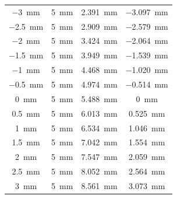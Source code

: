 \begin{table}[ht]
\begin{tabular}{| c | c | c | c |}
        \SI{-3}{mm}           & \SI{5}{mm}     & \SI{2.391}{mm}      & \SI{-3.097}{mm}   \\
        \SI{-2.5}{mm}         & \SI{5}{mm}     & \SI{2.909}{mm}      & \SI{-2.579}{mm}   \\
        \SI{-2}{mm}           & \SI{5}{mm}     & \SI{3.424}{mm}      & \SI{-2.064}{mm}   \\
        \SI{-1.5}{mm}         & \SI{5}{mm}     & \SI{3.949}{mm}      & \SI{-1.539}{mm}   \\
        \SI{-1}{mm}           & \SI{5}{mm}     & \SI{4.468}{mm}      & \SI{-1.020}{mm}   \\
        \SI{-0.5}{mm}         & \SI{5}{mm}     & \SI{4.974}{mm}      & \SI{-0.514}{mm}   \\
        \SI{0}{mm}            & \SI{5}{mm}     & \SI{5.488}{mm}      & \SI{0}{mm}        \\
        \SI{0.5}{mm}          & \SI{5}{mm}     & \SI{6.013}{mm}      & \SI{0.525}{mm}    \\
        \SI{1}{mm}            & \SI{5}{mm}     & \SI{6.534}{mm}      & \SI{1.046}{mm}    \\
        \SI{1.5}{mm}          & \SI{5}{mm}     & \SI{7.042}{mm}      & \SI{1.554}{mm}    \\
        \SI{2}{mm}            & \SI{5}{mm}     & \SI{7.547}{mm}      & \SI{2.059}{mm}    \\
        \SI{2.5}{mm}          & \SI{5}{mm}     & \SI{8.052}{mm}      & \SI{2.564}{mm}    \\
        \SI{3}{mm}            & \SI{5}{mm}     & \SI{8.561}{mm}      & \SI{3.073}{mm}    \\
        \hline
    \end{tabular}
    \label{tab:d410}
\end{table}



